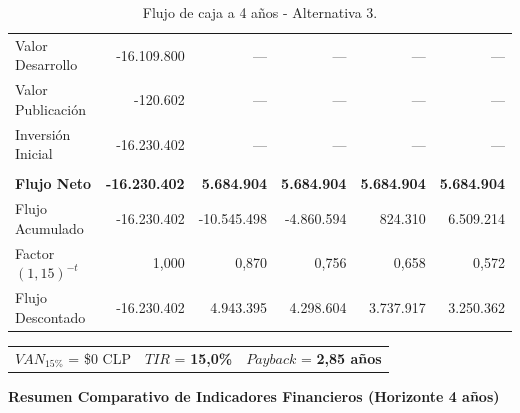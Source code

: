 \begin{table}[h!]
\begin{tabular}{|m{3.2cm}|r|r|r|r|r|}
        & & & & & \\ \hline
        Valor Desarrollo & -16.109.800 & --- & --- & --- & --- \\ \hline
        Valor Publicación & -120.602 & --- & --- & --- & --- \\ \hline
        \rowcolor[HTML]{F3E5F5} 
        Inversión Inicial & -16.230.402 & --- & --- & --- & --- \\ \hline
        & & & & & \\ \hline
        \rowcolor[HTML]{E8F5E9}
        \textbf{Flujo Neto} & \textbf{-16.230.402} & \textbf{5.684.904} & \textbf{5.684.904} & \textbf{5.684.904} & \textbf{5.684.904} \\ \hline
        Flujo Acumulado & -16.230.402 & -10.545.498 & -4.860.594 & 824.310 & 6.509.214 \\ \hline
        \rowcolor[HTML]{F3E5F5}
        Factor $(1{,}15)^{-t}$ & 1,000 & 0,870 & 0,756 & 0,658 & 0,572 \\ \hline
        \rowcolor[HTML]{F3E5F5}
        Flujo Descontado & -16.230.402 & 4.943.395 & 4.298.604 & 3.737.917 & 3.250.362 \\ \hline
    \end{tabular}
    \caption{Flujo de caja a 4 años - Alternativa 3.}
    \label{tab:flujo_alt3}
\end{table}

\begin{center}
\begin{tabular}{lll}
    $VAN_{15\%}$ = \$0 CLP \quad & $TIR$ = \textbf{15,0\%} \quad & $Payback$ = \textbf{2,85 años}
\end{tabular}
\end{center}

\textbf{Resumen Comparativo de Indicadores Financieros (Horizonte 4 años)}

